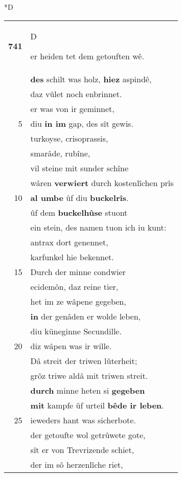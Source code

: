 \documentclass[8pt,a4paper,notitlepage]{article}
\begin{document}
\begin{table}[ht]
\begin{minipage}[t]{0.5\linewidth}
\small
\begin{center}*D
\end{center}
\begin{tabular}{rl}
\textbf{741} & \begin{large}D\end{large}er heiden tet dem getouften wê.\\ 
 & \textbf{des} schilt was holz, \textbf{hiez} aspindê,\\ 
 & daz vûlet noch enbrinnet.\\ 
 & er was von ir geminnet,\\ 
5 & diu \textbf{in im} gap, des sît gewis.\\ 
 & turkoyse, crisoprassis,\\ 
 & smarâde, rubîne,\\ 
 & vil steine mit sunder schîne\\ 
 & wâren \textbf{verwiert} durch kostenlîchen prîs\\ 
10 & \textbf{al umbe} ûf diu \textbf{buckelrîs}.\\ 
 & ûf dem \textbf{buckelhûse} stuont\\ 
 & ein stein, des namen tuon ich iu kunt:\\ 
 & antrax dort genennet,\\ 
 & karfunkel hie bekennet.\\ 
15 & Durch der minne condwier\\ 
 & ecidemôn, daz reine tier,\\ 
 & het im ze wâpene gegeben,\\ 
 & \textbf{in} der genâden er wolde leben,\\ 
 & diu küneginne Secundille.\\ 
20 & diz wâpen was ir wille.\\ 
 & Dâ streit der triwen lûterheit;\\ 
 & grôz triwe aldâ mit triwen streit.\\ 
 & \textbf{durch} minne heten si \textbf{gegeben}\\ 
 & \textbf{mit} kampfe ûf urteil \textbf{bêde ir leben}.\\ 
25 & ieweders hant was sicherbote.\\ 
 & der getoufte wol getrûwete gote,\\ 
 & sît er von Trevrizende schiet,\\ 
 & der im sô herzenlîche riet,\\ 

\end{tabular}
\end{minipage}
\end{table}
\end{document}
